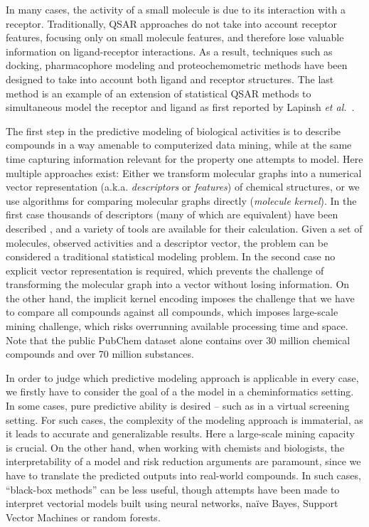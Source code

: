 \documentclass{sig-alternate}
\begin{document}
In many cases, the activity of a small molecule is due to its
interaction with a receptor. Traditionally, QSAR \cite{Hansch:1962vn,
  Free:1964ys} approaches do not take into account receptor features,
focusing only on small molecule features, and therefore lose valuable
information on ligand-receptor interactions. As a result, techniques
such as docking, pharmacophore modeling and proteochemometric methods
have been designed to take into account both ligand and receptor
structures. The last method is an example of an extension of
statistical QSAR methods to simultaneous model the receptor and
ligand as first reported by Lapinsh \textit{et  al.}~\cite{lapinsh2001}.

The first step in the predictive modeling of biological activities is
to describe compounds in a way amenable to computerized data mining,
while at the same time capturing information relevant for the property
one attempts to model. Here multiple approaches exist: Either we
transform molecular graphs into a numerical vector representation
(a.k.a. \emph{descriptors} or \emph{features}) of chemical structures,
or we use algorithms for comparing molecular graphs directly
(\emph{molecule kernel}). In the first case thousands of descriptors
(many of which are equivalent) have been described
\cite{todeschini2000}, and a variety of tools are available for their
calculation. Given a set of molecules, observed activities and a
descriptor vector, the problem can be considered a traditional
statistical modeling problem. In the second case no explicit vector
representation is required, which prevents the challenge of
transforming the molecular graph into a vector without losing
information. On the other hand, the implicit kernel encoding imposes
the challenge that we have to compare all compounds against all
compounds, which imposes large-scale mining challenge, which risks
overrunning available processing time and space. Note that the public
PubChem dataset alone contains over 30 million chemical compounds and
over 70 million substances.

In order to judge which predictive modeling approach is applicable in
every case, we firstly have to consider the goal of a the model in a
cheminformatics setting. In some cases, pure predictive ability is
desired -- such as in a virtual screening setting. For such cases, the
complexity of the modeling approach is immaterial, as it leads to
accurate and generalizable results. Here a large-scale mining capacity
is crucial. On the other hand, when working with chemists and
biologists, the interpretability of a model and risk reduction
arguments are paramount, since we have to translate the predicted
outputs into real-world compounds. In such cases, ``black-box
methods'' can be less useful, though attempts have been made to
interpret vectorial models built using neural networks, na\"{i}ve
Bayes, Support Vector Machines or random forests.
\end{document}
